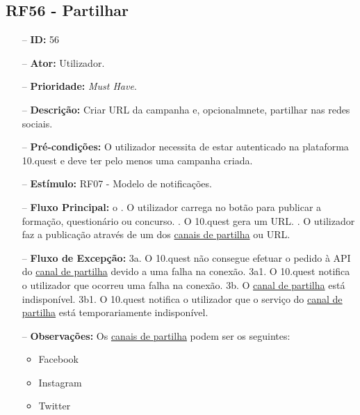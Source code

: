 \subsection{RF56 - Partilhar}
\begin{itemize}
	\item[--] \textbf{ID:} 56
	\item[--]  \textbf{Ator:} Utilizador.
	\item[--]  \textbf{Prioridade:} \textit{Must Have}.
	\item[--]  \textbf{Descrição:} Criar URL da campanha e, opcionalmnete, partilhar nas redes sociais.
	\item[--]  \textbf{Pré-condições:} O utilizador necessita de estar autenticado na plataforma 10.quest e deve ter pelo menos uma campanha criada.
	\item[--]  \textbf{Estímulo:} RF07 - Modelo de notificações.
	\item[--]  \textbf{Fluxo Principal:} 
	\subitem o 
	. O utilizador carrega no botão para publicar a formação, questionário ou concurso.
	. O 10.quest gera um URL.
	. O utilizador faz a publicação através de um dos \underline{canais de partilha} ou URL.
	\item[--]  \textbf{Fluxo de Excepção:} 
	\subitem 3a. O 10.quest não consegue efetuar o pedido à API do \underline{canal de partilha} devido a uma falha na conexão.
	\subitem 3a1. O 10.quest notifica o utilizador que ocorreu uma falha na conexão.
	\subitem 3b. O \underline{canal de partilha} está indisponível.
	\subitem 3b1. O 10.quest notifica o utilizador que o serviço do \underline{canal de partilha} está temporariamente indisponível.
	\item[--]  \textbf{Observações:} Os \underline{canais de partilha} podem ser os seguintes:
	\begin{itemize}
		\item Facebook
		\item Instagram
		\item Twitter
	\end{itemize}
\end{itemize}
\newpage

